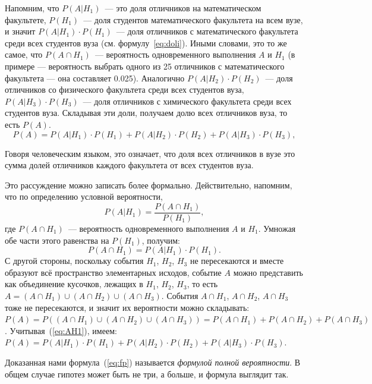 \documentclass[11pt]{article}
\begin{document}
Напомним, что $P(A|H_1)$~--- это доля отличников на математическом факультете, $P(H_1)$~--- доля студентов математического факультета на всем вузе, и значит $P(A|H_1)\cdot P(H_1)$~--- доля отличников с математического факультета среди всех студентов вуза (см. формулу~\eqref{eq:doli}). Иными словами, это то же самое, что $P(A\cap H_1)$~--- вероятность одновременного выполнения $A$ и $H_1$ (в примере — вероятность выбрать одного из 25 отличников с математического факультета — она составляет 0.025). Аналогично $P(A|H_2)\cdot P(H_2)$~--- доля отличников со физического факультета среди всех студентов вуза, $P(A|H_3)\cdot P(H_3)$~--- доля отличников с химического факультета среди всех студентов вуза. Складывая эти доли, получаем долю всех отличников вуза, то есть $P(A)$.
\begin{equation}\label{eq:fp}
	P(A)=P(A|H_1)\cdot P(H_1)+P(A|H_2)\cdot P(H_2)+P(A|H_3)\cdot P(H_3),
\end{equation}

Говоря человеческим языком, это означает, что доля всех отличников в вузе это сумма долей отличников каждого факультета от всех студентов вуза.

\vspace{1em}
{\footnotesize
Это рассуждение можно записать более формально. Действительно, напомним, что по определению условной вероятности,
\begin{equation}
	P(A|H_1)=\frac{P(A\cap H_1)}{P(H_1)},
\end{equation}
где $P(A\cap H_1)$~--- вероятность одновременного выполнения $A$ и $H_1$. Умножая обе части этого равенства на $P(H_1)$, получим:
\begin{equation}\label{eq:AH1}
	P(A\cap H_1)=P(A|H_1)\cdot P(H_1).
\end{equation}
С другой стороны, поскольку события $H_1$, $H_2$, $H_3$ не пересекаются и вместе образуют всё пространство элементарных исходов, событие $A$ можно представить как объединение кусочков, лежащих в $H_1$, $H_2$, $H_3$, то есть $A=(A\cap H_1)\cup (A\cap H_2)\cup (A\cap H_3)$. События $A\cap H_1$, $A\cap H_2$, $A\cap H_3$ тоже не пересекаются, и значит их вероятности можно складывать: $P(A)=P((A\cap H_1)\cup (A\cap H_2)\cup (A\cap H_3))=P(A\cap H_1)+P(A\cap H_2)+P(A\cap H_3)$. Учитывая~(\ref{eq:AH1}), имеем: $P(A)=P(A|H_1)\cdot P(H_1)+P(A|H_2)\cdot P(H_2)+P(A|H_3)\cdot P(H_3)$. }
\vspace{1em}

Доказанная нами формула~(\ref{eq:fp}) называется \textit{формулой полной вероятности}. В общем случае гипотез может быть не три, а больше, и формула выглядит так.
\end{document}
